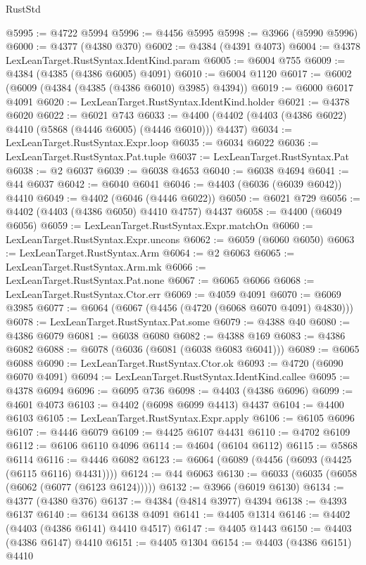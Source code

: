 \begin{lexlean}{RustStd}
\begin{coremodule}
@5995 := @4722 @5994
@5996 := @4456 @5995
@5998 := @3966 (@5990 @5996)
@6000 := @4377 (@4380 @370)
@6002 := @4384 (@4391 @4073)
@6004 := @4378 LexLeanTarget.RustSyntax.IdentKind.param
@6005 := @6004 @755
@6009 := @4384 (@4385 (@4386 @6005) @4091)
@6010 := @6004 @1120
@6017 := @6002 (@6009 (@4384 (@4385 (@4386 @6010) @3985) @4394))
@6019 := @6000 @6017 @4091
@6020 := LexLeanTarget.RustSyntax.IdentKind.holder
@6021 := @4378 @6020
@6022 := @6021 @743
@6033 := @4400 (@4402 (@4403 (@4386 @6022) @4410 (@5868 (@4446 @6005) (@4446 @6010))) @4437)
@6034 := LexLeanTarget.RustSyntax.Expr.loop
@6035 := @6034 @6022
@6036 := LexLeanTarget.RustSyntax.Pat.tuple
@6037 := LexLeanTarget.RustSyntax.Pat
@6038 := @2 @6037
@6039 := @6038 @4653
@6040 := @6038 @4694
@6041 := @44 @6037
@6042 := @6040 @6041
@6046 := @4403 (@6036 (@6039 @6042)) @4410
@6049 := @4402 (@6046 (@4446 @6022))
@6050 := @6021 @729
@6056 := @4402 (@4403 (@4386 @6050) @4410 @4757) @4437
@6058 := @4400 (@6049 @6056)
@6059 := LexLeanTarget.RustSyntax.Expr.matchOn
@6060 := LexLeanTarget.RustSyntax.Expr.uncons
@6062 := @6059 (@6060 @6050)
@6063 := LexLeanTarget.RustSyntax.Arm
@6064 := @2 @6063
@6065 := LexLeanTarget.RustSyntax.Arm.mk
@6066 := LexLeanTarget.RustSyntax.Pat.none
@6067 := @6065 @6066
@6068 := LexLeanTarget.RustSyntax.Ctor.err
@6069 := @4059 @4091
@6070 := @6069 @3985
@6077 := @6064 (@6067 (@4456 (@4720 (@6068 @6070 @4091) @4830)))
@6078 := LexLeanTarget.RustSyntax.Pat.some
@6079 := @4388 @40
@6080 := @4386 @6079
@6081 := @6038 @6080
@6082 := @4388 @169
@6083 := @4386 @6082
@6088 := @6078 (@6036 (@6081 (@6038 @6083 @6041)))
@6089 := @6065 @6088
@6090 := LexLeanTarget.RustSyntax.Ctor.ok
@6093 := @4720 (@6090 @6070 @4091)
@6094 := LexLeanTarget.RustSyntax.IdentKind.callee
@6095 := @4378 @6094
@6096 := @6095 @736
@6098 := @4403 (@4386 @6096)
@6099 := @4601 @4073
@6103 := @4402 (@6098 @6099 @4413) @4437
@6104 := @4400 @6103
@6105 := LexLeanTarget.RustSyntax.Expr.apply
@6106 := @6105 @6096
@6107 := @4446 @6079
@6109 := @4425 @6107 @4431
@6110 := @4702 @6109
@6112 := @6106 @6110 @4096
@6114 := @4604 (@6104 @6112)
@6115 := @5868 @6114
@6116 := @4446 @6082
@6123 := @6064 (@6089 (@4456 (@6093 (@4425 (@6115 @6116) @4431))))
@6124 := @44 @6063
@6130 := @6033 (@6035 (@6058 (@6062 (@6077 (@6123 @6124)))))
@6132 := @3966 (@6019 @6130)
@6134 := @4377 (@4380 @376)
@6137 := @4384 (@4814 @3977) @4394
@6138 := @4393 @6137
@6140 := @6134 @6138 @4091
@6141 := @4405 @1314
@6146 := @4402 (@4403 (@4386 @6141) @4410 @4517)
@6147 := @4405 @1443
@6150 := @4403 (@4386 @6147) @4410
@6151 := @4405 @1304
@6154 := @4403 (@4386 @6151) @4410

\end{coremodule}
\end{lexlean}
